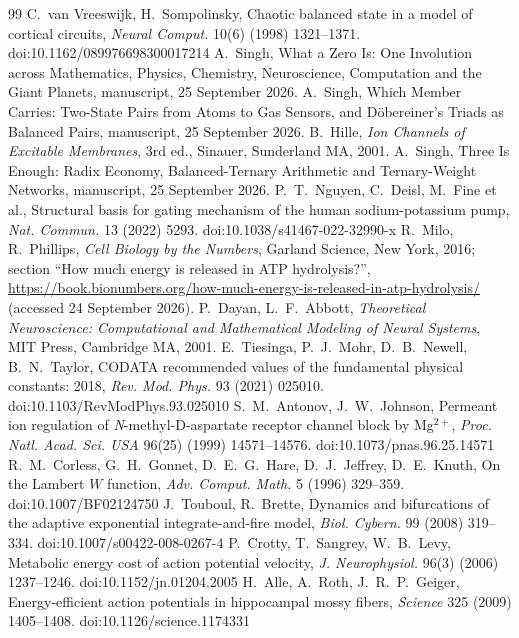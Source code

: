 \documentclass[11pt]{article}
\theoremstyle{definition}\newtheorem{definition}[theorem]{Definition}
\theoremstyle{remark}\newtheorem{remark}[theorem]{Remark}
\begin{document}
\begin{thebibliography}{99}
 C.~van Vreeswijk, H.~Sompolinsky, Chaotic balanced state in a model of cortical circuits, \emph{Neural Comput.} 10(6) (1998) 1321--1371. doi:10.1162/089976698300017214
 A.~Singh, What a Zero Is: One Involution across Mathematics, Physics, Chemistry, Neuroscience, Computation and the Giant Planets, manuscript, 25 September 2026.
 A.~Singh, Which Member Carries: Two-State Pairs from Atoms to Gas Sensors, and D\"obereiner's Triads as Balanced Pairs, manuscript, 25 September 2026.
 B.~Hille, \emph{Ion Channels of Excitable Membranes}, 3rd ed., Sinauer, Sunderland MA, 2001.
 A.~Singh, Three Is Enough: Radix Economy, Balanced-Ternary Arithmetic and Ternary-Weight Networks, manuscript, 25 September 2026.
 P.~T.~Nguyen, C.~Deisl, M.~Fine et al., Structural basis for gating mechanism of the human sodium-potassium pump, \emph{Nat. Commun.} 13 (2022) 5293. doi:10.1038/s41467-022-32990-x
 R.~Milo, R.~Phillips, \emph{Cell Biology by the Numbers}, Garland Science, New York, 2016; section ``How much energy is released in ATP hydrolysis?'', \url{https://book.bionumbers.org/how-much-energy-is-released-in-atp-hydrolysis/} (accessed 24 September 2026).
 P.~Dayan, L.~F.~Abbott, \emph{Theoretical Neuroscience: Computational and Mathematical Modeling of Neural Systems}, MIT Press, Cambridge MA, 2001.
 E.~Tiesinga, P.~J.~Mohr, D.~B.~Newell, B.~N.~Taylor, CODATA recommended values of the fundamental physical constants: 2018, \emph{Rev. Mod. Phys.} 93 (2021) 025010. doi:10.1103/RevModPhys.93.025010
 S.~M.~Antonov, J.~W.~Johnson, Permeant ion regulation of \emph{N}-methyl-D-aspartate receptor channel block by Mg$^{2+}$, \emph{Proc. Natl. Acad. Sci. USA} 96(25) (1999) 14571--14576. doi:10.1073/pnas.96.25.14571
 R.~M.~Corless, G.~H.~Gonnet, D.~E.~G.~Hare, D.~J.~Jeffrey, D.~E.~Knuth, On the Lambert $W$ function, \emph{Adv. Comput. Math.} 5 (1996) 329--359. doi:10.1007/BF02124750
 J.~Touboul, R.~Brette, Dynamics and bifurcations of the adaptive exponential integrate-and-fire model, \emph{Biol. Cybern.} 99 (2008) 319--334. doi:10.1007/s00422-008-0267-4
 P.~Crotty, T.~Sangrey, W.~B.~Levy, Metabolic energy cost of action potential velocity, \emph{J. Neurophysiol.} 96(3) (2006) 1237--1246. doi:10.1152/jn.01204.2005
 H.~Alle, A.~Roth, J.~R.~P.~Geiger, Energy-efficient action potentials in hippocampal mossy fibers, \emph{Science} 325 (2009) 1405--1408. doi:10.1126/science.1174331
\end{thebibliography}
\end{document}

